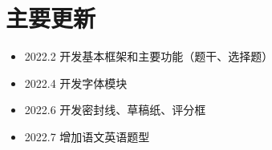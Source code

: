 
\section{主要更新}

\begin{itemize}
  \item 2022.2 开发基本框架和主要功能（题干、选择题）
  \item 2022.4 开发字体模块
  \item 2022.6 开发密封线、草稿纸、评分框
  \item 2022.7 增加语文英语题型
\end{itemize}